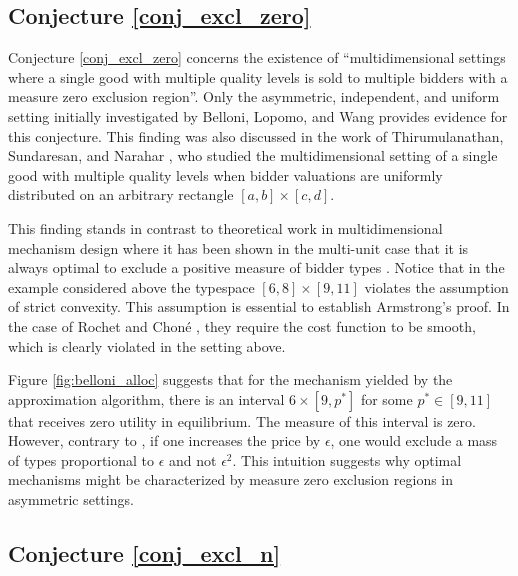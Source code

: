 \documentclass{article}
\newcounter{fig}
\begin{document}
\subsection{Conjecture \ref{conj_excl_zero}}

Conjecture \ref{conj_excl_zero} concerns the existence of ``multidimensional settings where a single good with multiple quality levels is sold to multiple bidders with a measure zero exclusion region''. Only the asymmetric, independent, and uniform setting initially investigated by Belloni, Lopomo, and Wang \autocite*{belloni2010multidimensional} provides evidence for this conjecture. This finding was also discussed in the work of Thirumulanathan, Sundaresan, and Narahar \autocite*{thirumulanathan2019unitdemand}, who studied the multidimensional setting of a single good with multiple quality levels when bidder valuations are uniformly distributed on an arbitrary rectangle $[a,b] \times [c,d]$. 

This finding stands in contrast to theoretical work in multidimensional mechanism design where it has been shown in the multi-unit case that it is always optimal to exclude a positive measure of bidder types \autocite{armstrong1996multiproduct,rochet1998ironing}. Notice that in the example considered above the typespace $[6,8]\times[9,11]$ violates the assumption of strict convexity. This assumption is essential to establish Armstrong's \autocite*{armstrong1996multiproduct} proof. In the case of Rochet and Choné \autocite*{rochet1998ironing}, they require the cost function to be smooth, which is clearly violated in the setting above.

Figure \ref{fig:belloni_alloc} suggests that for the mechanism yielded by the approximation algorithm, there is an interval $6\times [9,p^*]$ for some $p^*\in [9,11]$ that receives zero utility in equilibrium. The measure of this interval is zero. However, contrary to \autocite[Proposition 1]{armstrong1996multiproduct}, if one increases the price by $\epsilon$, one would exclude a mass of types proportional to $\epsilon$ and not $\epsilon^2$. This intuition suggests why optimal mechanisms might be characterized by measure zero exclusion regions in asymmetric settings. 





\subsection{Conjecture \ref{conj_excl_n}}
\end{document}
